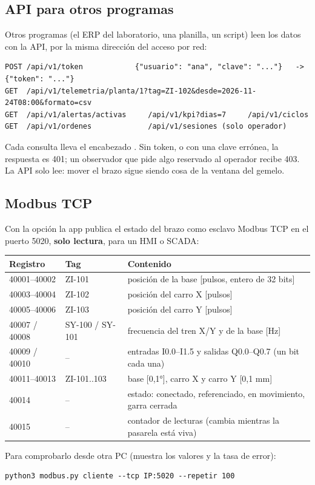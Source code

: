 \subsection{API para otros programas}
Otros programas (el ERP del laboratorio, una planilla, un script) leen los datos con la API, por la misma dirección del acceso por red:
\begin{lstlisting}
POST /api/v1/token            {"usuario": "ana", "clave": "..."}   ->  {"token": "..."}
GET  /api/v1/telemetria/planta/1?tag=ZI-102&desde=2026-11-24T08:00&formato=csv
GET  /api/v1/alertas/activas     /api/v1/kpi?dias=7     /api/v1/ciclos
GET  /api/v1/ordenes             /api/v1/sesiones (solo operador)
\end{lstlisting}
Cada consulta lleva el encabezado . Sin token, o con una clave errónea, la respuesta es 401; un observador que pide algo reservado al operador recibe 403. La API solo lee: mover el brazo sigue siendo cosa de la ventana del gemelo.

\subsection{Modbus TCP}
Con la opción  la app publica el estado del brazo como esclavo Modbus TCP en el puerto 5020, \textbf{solo lectura}, para un HMI o SCADA:
\begin{center}\small
\begin{tabular}{@{}lll@{}}
\toprule
\textbf{Registro} & \textbf{Tag} & \textbf{Contenido}\\
\midrule
40001--40002 & ZI-101 & posición de la base [pulsos, entero de 32 bits]\\
40003--40004 & ZI-102 & posición del carro X [pulsos]\\
40005--40006 & ZI-103 & posición del carro Y [pulsos]\\
40007 / 40008 & SY-100 / SY-101 & frecuencia del tren X/Y y de la base [Hz]\\
40009 / 40010 & -- & entradas I0.0--I1.5 y salidas Q0.0--Q0.7 (un bit cada una)\\
40011--40013 & ZI-101..103 & base [0,1°], carro X y carro Y [0,1 mm]\\
40014 & -- & estado: conectado, referenciado, en movimiento, garra cerrada\\
40015 & -- & contador de lecturas (cambia mientras la pasarela está viva)\\
\bottomrule
\end{tabular}
\end{center}
Para comprobarlo desde otra PC (muestra los valores y la tasa de error):
\begin{lstlisting}
python3 modbus.py cliente --tcp IP:5020 --repetir 100
\end{lstlisting}

